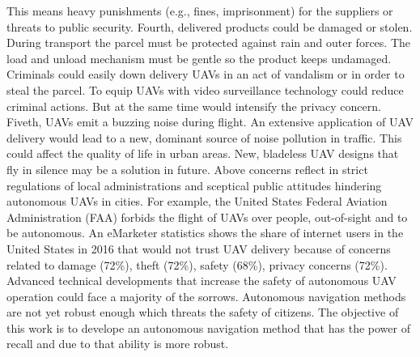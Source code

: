 This means heavy punishments (e.g., fines, imprisonment) for the suppliers or threats to public security.
Fourth, delivered products could be damaged or stolen.
During transport the parcel must be protected against rain and outer forces.
The load and unload mechanism must be gentle so the product keeps undamaged.
Criminals could easily down delivery UAVs in an act of vandalism or in order to steal the parcel.
To equip UAVs with video surveillance technology could reduce criminal actions.
But at the same time would intensify the privacy concern.
Fiveth, UAVs emit a buzzing noise during flight.
An extensive application of UAV delivery would lead to a new, dominant source of noise pollution in traffic.
This could affect the quality of life in urban areas.
New, bladeless UAV designs that fly in silence may be a solution in future. \cite{Holt2017}
Above concerns reflect in strict regulations of local administrations and sceptical public attitudes hindering autonomous UAVs in cities.
For example, the United States Federal Aviation Administration (FAA) forbids the flight of UAVs over people,
out-of-sight and to be autonomous. \cite{DailyCaller2017}
An eMarketer statistics \cite{eMarketer2016} shows the share of internet users in the United States in 2016 
that would not trust UAV delivery because of concerns related to damage (72\%), theft (72\%), safety (68\%), privacy concerns (72\%).
Advanced technical developments that increase the safety of autonomous UAV operation could face a majority of the sorrows.
Autonomous navigation methods are not yet robust enough which threats the safety of citizens.
The objective of this work is to develope an autonomous navigation method
that has the power of recall and due to that ability is more robust.




%
%
%
%






